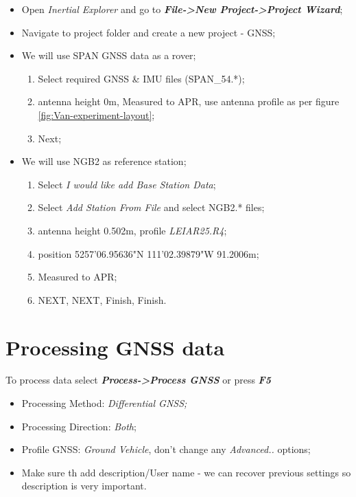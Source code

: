 \documentclass[11pt,fleqn]{book} %
\begin{document}
\begin{itemize}
	\item Open \emph{Inertial Explorer} and go to \textbf{\emph{File->New Project->Project Wizard}};
	\item Navigate to project folder and create a new project - GNSS;
	\item We will use SPAN GNSS data as a rover;
	\begin{enumerate}
		\item Select required GNSS \& IMU files (SPAN\_54.{*});
		\item antenna height 0m, Measured to APR, use antenna profile as per figure \ref{fig:Van-experiment-layout};
		\item Next;
	\end{enumerate}
	\item We will use NGB2 as reference station;
	\begin{enumerate}
		\item Select \textit{I would like add Base Station Data};
		\item Select \textit{Add Station From File} and select NGB2.{*} files;
		\item antenna height 0.502m, profile \emph{LEIAR25.R4};
		\item position 52\textdegree{}57'06.95636"N  1\textdegree{}11'02.39879"W  91.2006m;
		\item Measured to APR;
		\item NEXT, NEXT, Finish, Finish.
	\end{enumerate}
\end{itemize}


\section{Processing GNSS data}\label{sec:GPS-process}

To process data select \textbf{\emph{Process->Process GNSS}} or press \textbf{\emph{F5}}

\begin{itemize}
	\item Processing Method: \emph{Differential GNSS;}
	\item Processing Direction: \emph{Both};
	\item Profile GNSS: \emph{Ground Vehicle}, don't change any \emph{Advanced..}
	options;
	\item Make sure th add description/User name - we can recover previous settings so description is very important.
\end{itemize}
\end{document}
